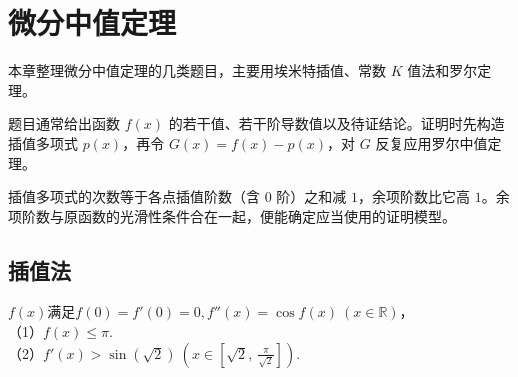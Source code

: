 \chapter{微分中值定理}
本章整理微分中值定理的几类题目，主要用埃米特插值、常数 $K$ 值法和罗尔定理。

题目通常给出函数 $f(x)$ 的若干值、若干阶导数值以及待证结论。证明时先构造插值多项式 $p(x)$，再令 $G(x)=f(x)-p(x)$，对 $G$ 反复应用罗尔中值定理。

插值多项式的次数等于各点插值阶数（含 $0$ 阶）之和减 $1$，余项阶数比它高 $1$。余项阶数与原函数的光滑性条件合在一起，便能确定应当使用的证明模型。
\section{插值法}

\begin{example}
$f(x)$满足$f(0) = f'(0) = 0, f''(x) = \cos f(x)\ (x \in \mathbb{R})$，
\\
（1）$f(x) \leqslant \pi$.\\
（2）$f'(x) > \sin\left(\sqrt{2}\right) \ \left(x \in \left[\sqrt{2},\ \frac{\pi}{\sqrt{2}}\right]\right)$.
\end{example}

